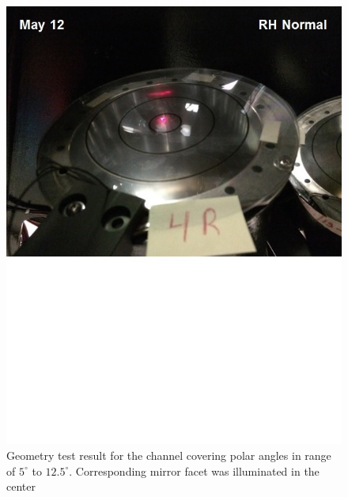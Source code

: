 \begin{figure}[ht]
    \centering
    \includegraphics[width=1.0\linewidth,trim={0 8.5cm 0 0},clip]{images/GEO_TEST_4_Normal.jpg}
    \caption{Geometry test result for the channel covering polar angles in range of $5^\circ$ to $12.5^\circ$. Corresponding mirror facet was illuminated in the center}
    \label{fig:GEO_TEST_4_Normal}
\end{figure}

